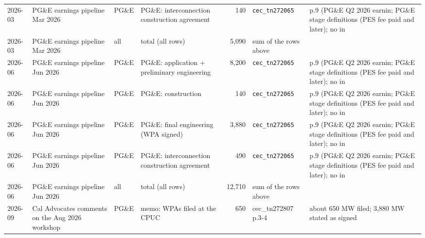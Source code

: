 \begin{tabular}{lp{3.2cm}lp{3.4cm}rp{4.2cm}p{5cm}}
2026-03 & PG\&E earnings pipeline Mar 2026 & PG\&E & PG\&E: interconnection construction agreement & 140 & \texttt{cec\_\allowbreak{}tn272065} & p.9 (PG\&E Q2 2026 earnin; PG\&E stage definitions (PES fee paid and later); no in \\
2026-03 & PG\&E earnings pipeline Mar 2026 & all & total (all rows) & 5,090 & sum of the rows above &  \\
\midrule
2026-06 & PG\&E earnings pipeline Jun 2026 & PG\&E & PG\&E: application + preliminary engineering & 8,200 & \texttt{cec\_\allowbreak{}tn272065} & p.9 (PG\&E Q2 2026 earnin; PG\&E stage definitions (PES fee paid and later); no in \\
2026-06 & PG\&E earnings pipeline Jun 2026 & PG\&E & PG\&E: construction & 140 & \texttt{cec\_\allowbreak{}tn272065} & p.9 (PG\&E Q2 2026 earnin; PG\&E stage definitions (PES fee paid and later); no in \\
2026-06 & PG\&E earnings pipeline Jun 2026 & PG\&E & PG\&E: final engineering (WPA signed) & 3,880 & \texttt{cec\_\allowbreak{}tn272065} & p.9 (PG\&E Q2 2026 earnin; PG\&E stage definitions (PES fee paid and later); no in \\
2026-06 & PG\&E earnings pipeline Jun 2026 & PG\&E & PG\&E: interconnection construction agreement & 490 & \texttt{cec\_\allowbreak{}tn272065} & p.9 (PG\&E Q2 2026 earnin; PG\&E stage definitions (PES fee paid and later); no in \\
2026-06 & PG\&E earnings pipeline Jun 2026 & all & total (all rows) & 12,710 & sum of the rows above &  \\
\midrule
2026-09 & Cal Advocates comments on the Aug 2026 workshop & PG\&E & memo: WPAs filed at the CPUC & 650 & cec\_tn272807 p.3-4 & about 650 MW filed; 3,880 MW stated as signed \\
\bottomrule
\end{tabular}